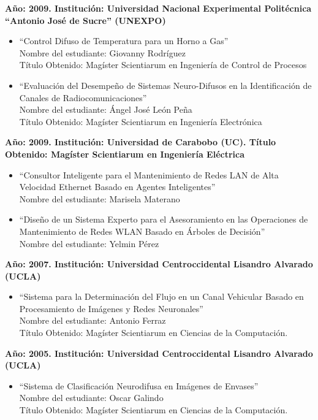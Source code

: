 \begin{footnotesize}
\begin{flushleft}
\textbf{Año: 2009. Institución: Universidad Nacional Experimental Politécnica “Antonio José de Sucre” (UNEXPO)}\\
\begin{itemize}
\item “Control Difuso de Temperatura para un Horno a Gas”\\
Nombre del estudiante: Giovanny Rodríguez\\
Título Obtenido: Magíster Scientiarum en Ingeniería de Control de Procesos 
\item “Evaluación del Desempeño de Sistemas Neuro-Difusos en la Identificación de Canales de Radiocomunicaciones”\\ 
Nombre del estudiante: Ángel José León Peña\\
Título Obtenido: Magíster Scientiarum en Ingeniería Electrónica 
\end{itemize}

\textbf{Año: 2009. Institución: Universidad de Carabobo (UC). Título Obtenido: Magíster Scientiarum en Ingeniería Eléctrica}\\
\begin{itemize}

\item “Consultor Inteligente  para el Mantenimiento  de Redes LAN de Alta Velocidad Ethernet Basado en Agentes Inteligentes”\\
Nombre del estudiante: Marisela Materano
\item “Diseño de  un Sistema Experto para el Asesoramiento en las Operaciones de Mantenimiento de Redes WLAN Basado en Árboles de Decisión”\\
Nombre del estudiante: Yelmin Pérez
\end{itemize}
 
\textbf{Año: 2007. Institución: Universidad Centroccidental Lisandro Alvarado (UCLA)}\\
\begin{itemize}
\item “Sistema para la Determinación del Flujo en un Canal Vehicular Basado en Procesamiento de Imágenes y Redes Neuronales”\\  
Nombre del estudiante: Antonio Ferraz\\
Título Obtenido: Magíster Scientiarum en Ciencias de la Computación.
\end{itemize}

\textbf{Año: 2005. Institución: Universidad Centroccidental Lisandro Alvarado (UCLA)}\\
\begin{itemize}
\item “Sistema de Clasificación Neurodifusa en Imágenes de Envases”\\
Nombre del estudiante: Oscar Galindo\\
Título Obtenido: Magíster Scientiarum en Ciencias de la Computación.
\end{itemize}



\end{flushleft}
\end{footnotesize}
